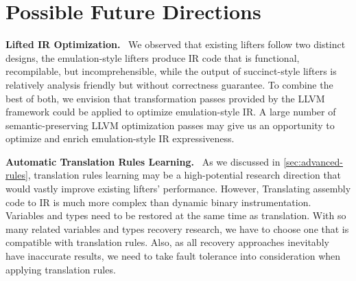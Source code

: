 \section{Possible Future Directions}\label{sec:future-directions}
\noindent\textbf{Lifted IR Optimization.}~
We observed that existing lifters follow two distinct designs, the emulation-style lifters produce IR code that is functional, recompilable, but incomprehensible, while the output of succinct-style lifters is relatively analysis friendly but without correctness guarantee. To combine the best of both, we envision that transformation passes provided by the LLVM framework could be applied to optimize emulation-style IR. A large number of semantic-preserving LLVM optimization passes may give us an opportunity to optimize and enrich emulation-style IR expressiveness.

\noindent\textbf{Automatic Translation Rules Learning.}~
As we discussed in \autoref{sec:advanced-rules}, translation rules learning may be a high-potential research direction that would vastly improve existing lifters' performance. However, Translating assembly code to IR is much more complex than dynamic binary instrumentation. Variables and types need to be restored at the same time as translation. With so many related variables and types recovery research, we have to choose one that is compatible with translation rules. Also, as all recovery approaches inevitably have inaccurate results, we need to take fault tolerance into consideration when applying translation rules.


\newpage
